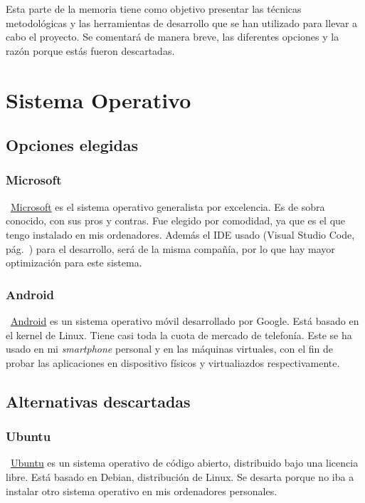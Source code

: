 
Esta parte de la memoria tiene como objetivo presentar las técnicas metodológicas y las herramientas de desarrollo que se han utilizado para llevar a cabo el proyecto. Se comentará de manera breve, las diferentes opciones y la razón porque estás fueron descartadas.

\section{Sistema Operativo}

\subsection{Opciones elegidas}

\subsubsection{Microsoft}
~\href{https://www.microsoft.com/es-es}{Microsoft} es el sistema operativo generalista por excelencia. Es de sobra conocido, con sus pros y contras. Fue elegido por comodidad, ya que es el que tengo instalado en mis ordenadores. Además el IDE usado (Visual Studio Code, pág.~\pageref{visual}) para el desarrollo, será de la misma compañía, por lo que hay mayor optimización para este sistema.

\subsubsection{Android}
~\href{https://www.android.com/intl/es_es/}{Android} es un sistema operativo móvil desarrollado por Google. Está basado en el kernel de Linux. Tiene casi toda la cuota de mercado de telefonía. Este se ha usado en mi \emph{smartphone} personal y en las máquinas virtuales, con el fin de probar las aplicaciones en dispositivo físicos y virtualiazdos respectivamente.

\subsection{Alternativas descartadas}

\subsubsection{Ubuntu}
~\href{https://ubuntu.com/}{Ubuntu} es un sistema operativo de código abierto, distribuido bajo una licencia libre. Está basado en Debian, distribución de Linux. Se desarta porque no iba a instalar otro sistema operativo en mis ordenadores personales.


